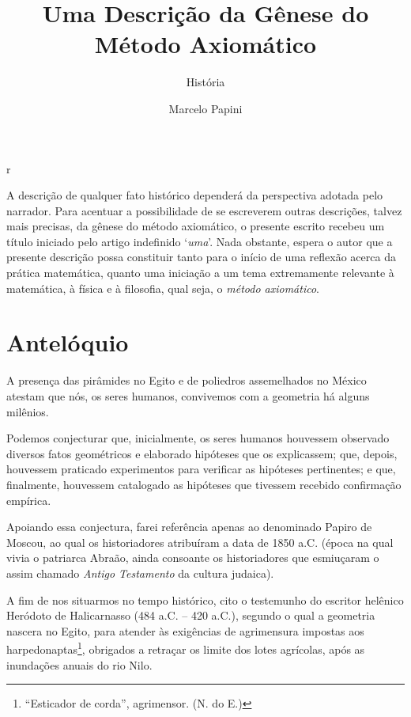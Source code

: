 r\documentclass{hipatia}
\title{Uma Descrição da Gênese do\\ Método Axiomático}
\subtitle{História}
\author{Marcelo Papini
}
\begin{document}
\setcounter{page}{\historiapage}
\maketitle


A descrição de qualquer fato histórico dependerá da perspectiva adotada pelo narrador. Para acentuar a possibilidade de se escreverem outras descrições, talvez mais precisas, da gênese do método axiomático, o presente escrito recebeu um título iniciado pelo artigo indefinido ‘\emph{uma}’.
Nada obstante, espera o autor que a presente descrição possa constituir tanto para o início de uma reflexão acerca da prática matemática, quanto uma iniciação a um tema extremamente relevante à matemática, à física e à filosofia, qual seja, o \emph{método axiomático}.







\section{Antelóquio}

A presença das pirâmides no Egito e de poliedros assemelhados no México atestam que nós, os seres humanos, convivemos  com a geometria há alguns milênios. 

Podemos conjecturar que, inicialmente, os seres humanos houvessem observado diversos fatos geométricos e elaborado hipóteses que os explicassem;  que, depois, houvessem praticado experimentos para verificar as hipóteses pertinentes;  e que, finalmente, houvessem catalogado as hipóteses que tivessem recebido confirmação empírica. 

Apoiando essa conjectura, farei referência apenas ao denominado Papiro de Moscou, ao qual os historiadores atribuíram a data de 1850 a.C.  (época na qual vivia o patriarca Abraão, ainda consoante os historiadores que esmiuçaram o assim chamado \emph{Antigo Testamento} da cultura judaica).

A fim de nos situarmos no tempo histórico, cito o testemunho do escritor helênico Heródoto de Halicarnasso (484 a.C. – 420 a.C.), segundo o qual a geometria nascera no Egito, para atender às exigências de agrimensura impostas aos harpedonaptas\footnote{``Esticador de corda'', agrimensor. (N. do E.)}, obrigados a retraçar os limite dos lotes agrícolas, após as inundações anuais do rio Nilo. 
\end{document}
